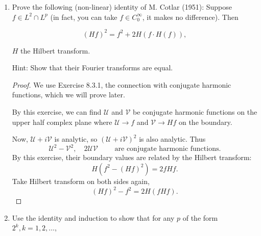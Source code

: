 \begin{enumerate}
for all $j=1, \ldots, n$.
Remark 4 This will give as different proof of the $L^p$ boundeness of the Riesz transforms and points the way to Hörmader's Theorem for general multiples.
\begin{proof}
	Recall
\[
		g_v(f)(x) = \left( \int _0^\infty y \left| \frac{\partial u_f}{\partial y}  (x,y) \right|^2 dy \right) ^{\frac{1}{2}}
	.\]
	\[
		g_h(f)(x) = \left( \int _0^\infty y \left| \nabla _x u_f (x,y) \right|^2 dy \right) ^{\frac{1}{2}}
	.\] 
	Write $y = x_0$,  and $f_0 = f$, $f_j = R_j f_0$. Write $u_j = u_{f_j}$. 
	We have
	\[
		\sum_{j=1}^{n} g_v^2(R_jf) = \int _0^\infty y \sum_{j=1}^{n}\left| \frac{\partial u_j}{\partial x_0}  (x,y) \right|^2 dy
	.\] 
	By Cauchy-Riemann equation, since $f_j = R_j f_0$, we have $\frac{\partial f_j}{\partial x_0}  = \frac{\partial f_0}{\partial x_j} $. This means
	\[
		\sum_{j=1}^{n} g_v^2(R_jf) = \int _0^\infty y \sum_{j=1}^{n}\left| \frac{\partial u_0}{\partial x_j}  (x,y) \right|^2 dy = \int _0^\infty y \left| \nabla_x  u_f \right|^2 dy = g_h^2(f)
	.\] 
\end{proof}

\item
	Prove the following (non-linear) identity of M. Cotlar (1951): Suppose $f \in L^2 \cap L^p$ (in fact, you can take $f \in C_0^{\infty}$, it makes no difference). Then

\[
(H f)^2=f^2+2 H(f \cdot H(f)),
\]

$H$ the Hilbert transform.

Hint: Show that their Fourier transforms are equal.

\begin{proof}
	We use Exercise 8.3.1, the connection with conjugate harmonic functions, which we will prove later.

	By this exercise, we can find $\mathcal{U}$ and $\mathcal{V}$ be conjugate harmonic functions on the upper half complex plane where $\mathcal{U} \to f$ and $\mathcal{V} \to H f$ on the boundary.

	Now, $\mathcal{U} + i \mathcal{V}$ is analytic, so $(\mathcal{U} + i \mathcal{V})^2$ is also analytic. Thus
	\[
		\mathcal{U}^2 - \mathcal{V}^2, \quad 2 \mathcal{U} \mathcal{V} \qquad \text{ are conjugate harmonic functions}
	.\] 
	By this exercise, their boundary values are related by the Hilbert transform:
	\[
		H(f^2 - (Hf)^2) = 2 f Hf
	.\] 
	Take Hilbert transform on both sides again,
	\[
		(Hf)^2 - f^2 = 2 H(f H f)
	.\] 
\end{proof}

\item 
	Use the identity and induction to show that for any $p$ of the form $2^k, k=1,2, \ldots$,


\end{enumerate}
